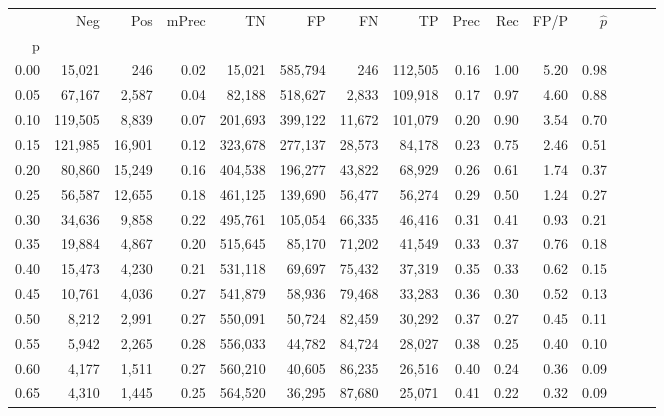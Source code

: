 \begin{tabular}{rrrrrrrrrrrrrrr}
\toprule
{} &      Neg &     Pos & mPrec &       TN &       FP &       FN &       TP &  Prec &   Rec &  FP/P & $\hat{p}$ \\
p    &          &         &       &          &          &          &          &       &       &       &           \\
\midrule
0.00 &   15,021 &     246 &  0.02 &   15,021 &  585,794 &      246 &  112,505 &  0.16 &  1.00 &  5.20 &      0.98 \\
0.05 &   67,167 &   2,587 &  0.04 &   82,188 &  518,627 &    2,833 &  109,918 &  0.17 &  0.97 &  4.60 &      0.88 \\
0.10 &  119,505 &   8,839 &  0.07 &  201,693 &  399,122 &   11,672 &  101,079 &  0.20 &  0.90 &  3.54 &      0.70 \\
0.15 &  121,985 &  16,901 &  0.12 &  323,678 &  277,137 &   28,573 &   84,178 &  0.23 &  0.75 &  2.46 &      0.51 \\
0.20 &   80,860 &  15,249 &  0.16 &  404,538 &  196,277 &   43,822 &   68,929 &  0.26 &  0.61 &  1.74 &      0.37 \\
0.25 &   56,587 &  12,655 &  0.18 &  461,125 &  139,690 &   56,477 &   56,274 &  0.29 &  0.50 &  1.24 &      0.27 \\
0.30 &   34,636 &   9,858 &  0.22 &  495,761 &  105,054 &   66,335 &   46,416 &  0.31 &  0.41 &  0.93 &      0.21 \\
0.35 &   19,884 &   4,867 &  0.20 &  515,645 &   85,170 &   71,202 &   41,549 &  0.33 &  0.37 &  0.76 &      0.18 \\
0.40 &   15,473 &   4,230 &  0.21 &  531,118 &   69,697 &   75,432 &   37,319 &  0.35 &  0.33 &  0.62 &      0.15 \\
0.45 &   10,761 &   4,036 &  0.27 &  541,879 &   58,936 &   79,468 &   33,283 &  0.36 &  0.30 &  0.52 &      0.13 \\
0.50 &    8,212 &   2,991 &  0.27 &  550,091 &   50,724 &   82,459 &   30,292 &  0.37 &  0.27 &  0.45 &      0.11 \\
0.55 &    5,942 &   2,265 &  0.28 &  556,033 &   44,782 &   84,724 &   28,027 &  0.38 &  0.25 &  0.40 &      0.10 \\
0.60 &    4,177 &   1,511 &  0.27 &  560,210 &   40,605 &   86,235 &   26,516 &  0.40 &  0.24 &  0.36 &      0.09 \\
0.65 &    4,310 &   1,445 &  0.25 &  564,520 &   36,295 &   87,680 &   25,071 &  0.41 &  0.22 &  0.32 &      0.09 \\

\end{tabular}
